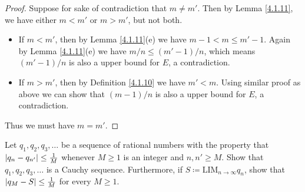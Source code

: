 \begin{proof}
    Suppose for sake of contradiction that \(m \neq m'\).
    Then by Lemma \ref{4.1.11}, we have either \(m < m'\) or \(m > m'\), but not both.
    \begin{itemize}
        \item If \(m < m'\), then by Lemma \ref{4.1.11}(e) we have \(m - 1 < m \leq m' - 1\).
              Again by Lemma \ref{4.1.11}(e) we have \(m / n \leq (m' - 1) / n\), which means \((m' - 1) / n\) is also a upper bound for \(E\), a contradiction.
        \item If \(m > m'\), then by Definition \ref{4.1.10} we have \(m' < m\).
              Using similar proof as above we can show that \((m - 1) / n\) is also a upper bound for \(E\), a contradiction.
    \end{itemize}
    Thus we must have \(m = m'\).
\end{proof}

\begin{exercise}\label{ex 5.5.4}
    Let \(q_1, q_2, q_3, \dots\) be a sequence of rational numbers with the property that \(\abs*{q_n - q_{n'}} \leq \frac{1}{M}\) whenever \(M \geq 1\) is an integer and \(n, n' \geq M\).
    Show that \(q_1, q_2, q_3, \dots\) is a Cauchy sequence.
    Furthermore, if \(S \coloneqq \text{LIM}_{n \to \infty} q_n\), show that \(\abs*{q_M - S} \leq \frac{1}{M}\) for every \(M \geq 1\).
\end{exercise}

